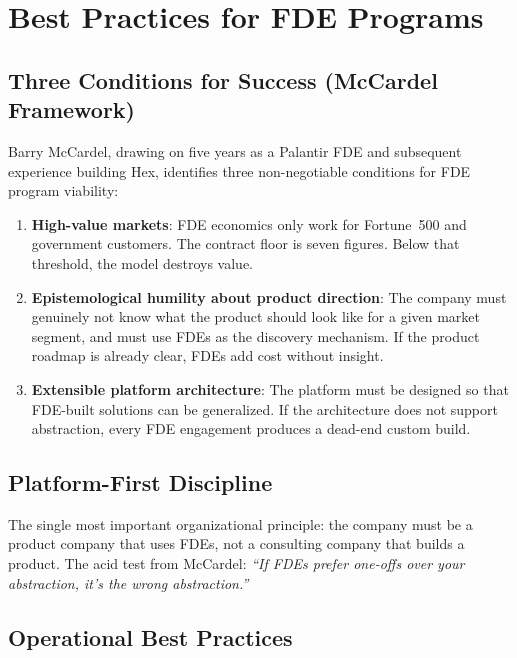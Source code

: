 \section{Best Practices for FDE Programs}

\subsection{Three Conditions for Success (McCardel Framework)}

Barry McCardel, drawing on five years as a Palantir FDE and subsequent
experience building Hex, identifies three non-negotiable conditions for
FDE program viability:

\begin{enumerate}
    \item \textbf{High-value markets}: FDE economics only work for
        Fortune~500 and government customers. The contract floor is
        seven figures. Below that threshold, the model destroys value.

    \item \textbf{Epistemological humility about product direction}:
        The company must genuinely not know what the product should look
        like for a given market segment, and must use FDEs as the
        discovery mechanism. If the product roadmap is already clear, FDEs
        add cost without insight.

    \item \textbf{Extensible platform architecture}: The platform must be
        designed so that FDE-built solutions can be generalized. If the
        architecture does not support abstraction, every FDE engagement
        produces a dead-end custom build.
\end{enumerate}

\subsection{Platform-First Discipline}

The single most important organizational principle: the company must be a
product company that uses FDEs, not a consulting company that builds a
product. The acid test from McCardel: \textit{``If FDEs prefer one-offs
over your abstraction, it's the wrong abstraction.''}

\subsection{Operational Best Practices}

